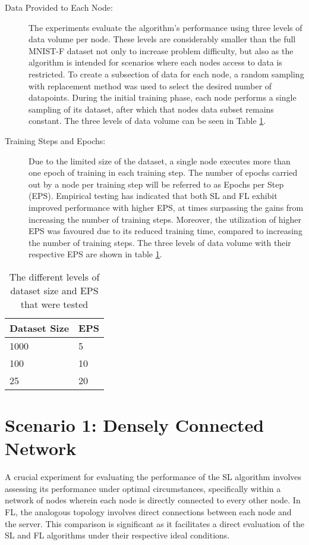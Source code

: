 \begin{description}
	\item [Data Provided to Each Node:] The experiments evaluate the algorithm's performance using three levels of data volume per node. These levels are considerably smaller than the full MNIST-F dataset not only to increase problem difficulty, but also as the algorithm is intended for scenarios where each nodes access to data is restricted. To create a subsection of data for each node, a random sampling with replacement method was used to select the desired number of datapoints. During the initial training phase, each node performs a single sampling of its dataset, after which that nodes data subset remains constant. The three levels of data volume can be seen in Table \ref{epsparams}.
	
	\item [Training Steps and Epochs:] Due to the limited size of the dataset, a single node executes more than one epoch of training in each training step. The number of epochs carried out by a node per training step will be referred to as Epochs per Step (EPS). Empirical testing has indicated that both SL and FL exhibit improved performance with higher EPS, at times surpassing the gains from increasing the number of training steps. Moreover, the utilization of higher EPS was favoured due to its reduced training time, compared to increasing the number of training steps. The three levels of data volume with their respective EPS are shown in table \ref{epsparams}.
	
\end{description}

\begin{table}[H]
	\centering
	\begin{tabular}{l|l}
		Dataset Size & EPS \\ \hline \hline
		1000   & 5  \\ \hline
		100   & 10  \\ \hline
		25  & 20 
	\end{tabular}
	\caption{The different levels of dataset size and EPS that were tested} \label{epsparams}
\end{table}

\section{Scenario 1: Densely Connected Network}
A crucial experiment for evaluating the performance of the SL algorithm involves assessing its performance under optimal circumstances, specifically within a network of nodes wherein each node is directly connected to every other node. In FL, the analogous topology involves direct connections between each node and the server. This comparison is significant as it facilitates a direct evaluation of the SL and FL algorithms under their respective ideal conditions.

